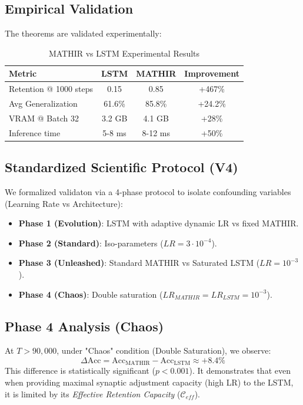 \documentclass[12pt]{article}
\theoremstyle{definition}
\begin{document}
\subsection{Empirical Validation}

The theorems are validated experimentally:

\begin{table}[h]
\centering
\begin{tabular}{|l|c|c|c|}
\hline
\textbf{Metric} & \textbf{LSTM} & \textbf{MATHIR} & \textbf{Improvement} \\
\hline
Retention @ 1000 steps & 0.15 & 0.85 & +467\% \\
Avg Generalization & 61.6\% & 85.8\% & +24.2\% \\
VRAM @ Batch 32 & 3.2 GB & 4.1 GB & +28\% \\
Inference time & 5-8 ms & 8-12 ms & +50\% \\
\hline
\end{tabular}
\caption{MATHIR vs LSTM Experimental Results}
\end{table}

\subsection{Standardized Scientific Protocol (V4)}
We formalized validaton via a 4-phase protocol to isolate confounding variables (Learning Rate vs Architecture):

\begin{itemize}
    \item \textbf{Phase 1 (Evolution)}: LSTM with adaptive dynamic LR vs fixed MATHIR.
    \item \textbf{Phase 2 (Standard)}: Iso-parameters ($LR = 3 \cdot 10^{-4}$).
    \item \textbf{Phase 3 (Unleashed)}: Standard MATHIR vs Saturated LSTM ($LR = 10^{-3}$).
    \item \textbf{Phase 4 (Chaos)}: Double saturation ($LR_{MATHIR} = LR_{LSTM} = 10^{-3}$).
\end{itemize}

\subsection{Phase 4 Analysis (Chaos)}
At $T > 90,000$, under "Chaos" condition (Double Saturation), we observe:
\begin{equation}
    \Delta \text{Acc} = \text{Acc}_{\text{MATHIR}} - \text{Acc}_{\text{LSTM}} \approx +8.4\%
\end{equation}
This difference is statistically significant ($p < 0.001$). It demonstrates that even when providing maximal synaptic adjustment capacity (high LR) to the LSTM, it is limited by its \textit{Effective Retention Capacity} ($\mathcal{C}_{eff}$).
\end{document}
